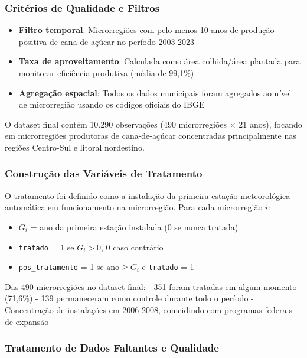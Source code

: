 \documentclass[
	12pt,				%
	oneside,			%
	a4paper,			%
	english,			%
	french,				%
	spanish,			%
	brazil				%
	]{abntex2}
\begin{document}
\subsubsection{Critérios de Qualidade e Filtros}

\begin{itemize}
\item \textbf{Filtro temporal}: Microrregiões com pelo menos 10 anos de produção positiva de cana-de-açúcar no período 2003-2023
\item \textbf{Taxa de aproveitamento}: Calculada como área colhida/área plantada para monitorar eficiência produtiva (média de 99,1\%)
\item \textbf{Agregação espacial}: Todos os dados municipais foram agregados ao nível de microrregião usando os códigos oficiais do IBGE
\end{itemize}

O dataset final contém 10.290 observações (490 microrregiões × 21 anos), focando em microrregiões produtoras de cana-de-açúcar concentradas principalmente nas regiões Centro-Sul e litoral nordestino. 

\subsubsection{Construção das Variáveis de Tratamento}

O tratamento foi definido como a instalação da primeira estação meteorológica automática em funcionamento na microrregião. Para cada microrregião $i$:

\begin{itemize}
\item $G_i$ = ano da primeira estação instalada (0 se nunca tratada)
\item \texttt{tratado} = 1 se $G_i > 0$, 0 caso contrário
\item \texttt{pos\_tratamento} = 1 se $\text{ano} \geq G_i$ e \texttt{tratado} = 1
\end{itemize}

Das 490 microrregiões no dataset final:
- 351 foram tratadas em algum momento (71,6\%)
- 139 permaneceram como controle durante todo o período
- Concentração de instalações em 2006-2008, coincidindo com programas federais de expansão

\subsubsection{Tratamento de Dados Faltantes e Qualidade}
\end{document}
